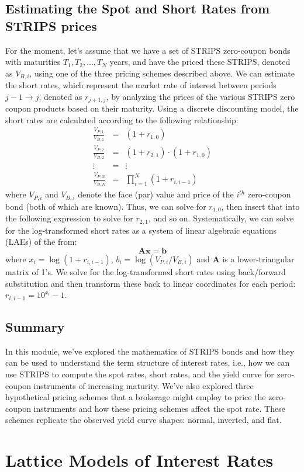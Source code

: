 \documentclass[11pt]{article}
\theoremstyle{definition}
\begin{document}
\subsection{Estimating the Spot and Short Rates from STRIPS prices}
For the moment, let's assume that we have a set of STRIPS zero-coupon bonds with maturities $T_{1}, T_{2},\ldots, T_{N}$ years, 
and have the priced these STRIPS, denoted as $V_{B, i}$, using one of the three pricing schemes described above.
We can estimate the short rates, which represent the market rate of interest between periods $j-1\rightarrow{j}$, denoted as $r_{j+1,j}$, by analyzing the prices of the various STRIPS zero coupon products based on their maturity. Using a discrete discounting model, the short rates are calculated according to the following relationship:
\begin{eqnarray}
\frac{V_{P,1}}{V_{B,1}} & = & \left(1+r_{1,0}\right) \\
\frac{V_{P,2}}{V_{B,2}} & = & \left(1+r_{2,1}\right)\cdot\left(1+r_{1,0}\right) \\
\vdots & = & \vdots \\
\frac{V_{P,N}}{V_{B,N}} & = & \prod_{i=1}^{N}\left(1+r_{i,i-1}\right)
\end{eqnarray}
where $V_{P, i}$ and $V_{B, i}$ denote the face (par) value and price of the $i^{th}$ zero-coupon bond (both of which are known). Thus, we can solve for $r_{1,0}$, then insert that into the following expression to solve for $r_{2,1}$, and so on. Systematically, we can solve for the log-transformed short rates as a system of linear algebraic equations (LAEs) of the from:
\begin{equation}
\mathbf{A}\mathbf{x} = \mathbf{b}
\end{equation}
where $x_{i} = \log\left(1+r_{i,i-1}\right)$, $b_{i} = \log\left(V_{P,i}/V_{B,i}\right)$ and $\mathbf{A}$ is a lower-triangular matrix of 1's. We solve for the log-transformed short rates using back/forward substitution
and then transform these back to linear coordinates for each period: $r_{i,i-1} = 10^{x_{i}} - 1$.

\subsection{Summary}
In this module, we've explored the mathematics of STRIPS bonds and how they can be used to understand the term structure of interest rates, i.e., how we can use STRIPS to compute the spot rates, short rates, and the yield curve for zero-coupon instruments of increasing maturity. 
We've also explored three hypothetical pricing schemes that a brokerage might employ to price the zero-coupon instruments and how these pricing schemes affect the spot rate. These schemes replicate the observed yield curve shapes: normal, inverted, and flat. 

\section{Lattice Models of Interest Rates}



\clearpage
\printindex
\end{document}
